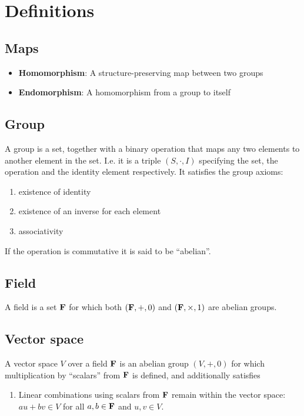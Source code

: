 \newcommand{\alphainv}{\alpha^{-1}}

\section{Definitions}

\subsection{Maps}
\begin{itemize}
\item \textbf{Homomorphism}: A structure-preserving map between two groups
\item \textbf{Endomorphism}: A homomorphism from a group to itself
\end{itemize}

\subsection{Group}
A group is a set, together with a binary operation that maps any two elements
to another element in the set. I.e. it is a triple $(S, \cdot, I)$ specifying
the set, the operation and the identity element respectively. It satisfies the
group axioms:
\begin{enumerate}
\item existence of identity
\item existence of an inverse for each element
\item associativity
\end{enumerate}
If the operation is commutative it is said to be ``abelian''.

\subsection{Field}
A field is a set $\mathbf{F}$ for which both $(\mathbf{F}, +, 0)$ and $(\mathbf{F}, \times, 1)$ are abelian groups.

\subsection{Vector space}
A vector space $V$ over a field $\mathbf{F}$ is an abelian group $(V, +, 0)$ for which
multiplication by ``scalars'' from $\mathbf{F}$ is defined, and additionally satisfies
\begin{enumerate}
\item Linear combinations using scalars from $\mathbf{F}$ remain within the vector
  space:\\
  $au + bv \in V$ for all $a, b \in \mathbf{F}$ and $u, v \in V$.
\end{enumerate}

